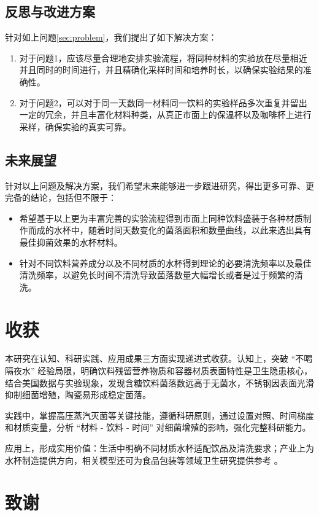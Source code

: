 \documentclass[12pt,a4paper]{ctexart}
\begin{document}
\subsection{反思与改进方案}
针对如上问题\ref{sec:problem}，我们提出了如下解决方案：
\begin{enumerate}
    \item 对于问题1，应该尽量合理地安排实验流程，将同种材料的实验放在尽量相近并且同时的时间进行，并且精确化采样时间和培养时长，以确保实验结果的准确性。
    \item 对于问题2，可以对于同一天数同一材料同一饮料的实验样品多次重复并留出一定的冗余，并且丰富化材料种类，从真正市面上的保温杯以及咖啡杯上进行采样，确保实验的真实可靠。
\end{enumerate}

\subsection{未来展望}
针对以上问题及解决方案，我们希望未来能够进一步跟进研究，得出更多可靠、更完备的结论，包括但不限于：
\begin{itemize}
    \item 希望基于以上更为丰富完善的实验流程得到市面上同种饮料盛装于各种材质制作而成的水杯中，随着时间天数变化的菌落面积和数量曲线，以此来选出具有最佳抑菌效果的水杯材料。
    \item 针对不同饮料营养成分以及不同材质的水杯得到理论的必要清洗频率以及最佳清洗频率，以避免长时间不清洗导致菌落数量大幅增长或者是过于频繁的清洗。
\end{itemize}

\section{收获}
本研究在认知、科研实践、应用成果三方面实现递进式收获。认知上，突破 “不喝隔夜水” 经验局限，明确饮料残留营养物质和容器材质表面特性是卫生隐患核心，结合美国数据与实验现象，发现含糖饮料菌落数远高于无菌水，不锈钢因表面光滑抑制细菌增殖，陶瓷易形成稳定菌落。

实践中，掌握高压蒸汽灭菌等关键技能，遵循科研原则，通过设置对照、时间梯度和材质变量，分析 “材料 - 饮料 - 时间” 对细菌增殖的影响，强化完整科研能力。

应用上，形成实用价值：生活中明确不同材质水杯适配饮品及清洗要求；产业上为水杯制造提供方向，相关模型还可为食品包装等领域卫生研究提供参考 。

\clearpage
\thispagestyle{empty} 
\section{致谢} %
\end{document}
